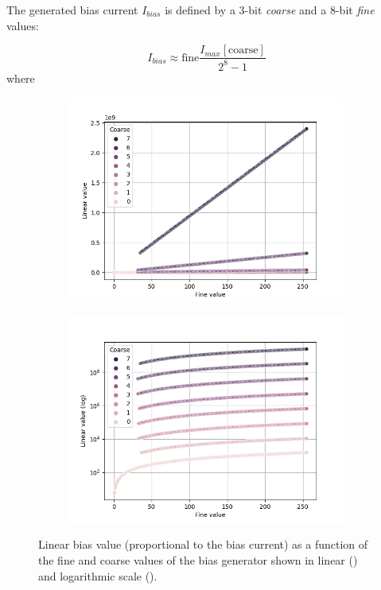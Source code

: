 The generated bias current $I_{bias}$ is defined by a 3-bit \emph{coarse} and a 8-bit \emph{fine} values:

\begin{equation}
I_{bias} \approx \textrm{fine}\frac{I_{max}[\textrm{coarse}]}{2^8-1}
\label{eq:bias_current}
\end{equation}
 where


\begin{figure}[t!]
    \begin{subfigure}{.47\textwidth}
    \includegraphics[width=\textwidth]{img/chapter4/linear_bias_map_full.png}
    \subcaption{}
    \label{fig:linear_bias_map_full}
  \end{subfigure}
  \begin{subfigure}{.47\textwidth}
    \includegraphics[width=\textwidth]{img/chapter4/linear_bias_map_log.png}
    \subcaption{}
    \label{fig:linear_bias_map_log}
  \end{subfigure}
  \caption[Linear bias value look-up table]{Linear bias value (proportional to the bias current) as a function of the fine and coarse values of the bias generator shown in linear () and logarithmic scale ().} 
  \label{fig:linear_bias_map}
\end{figure}

